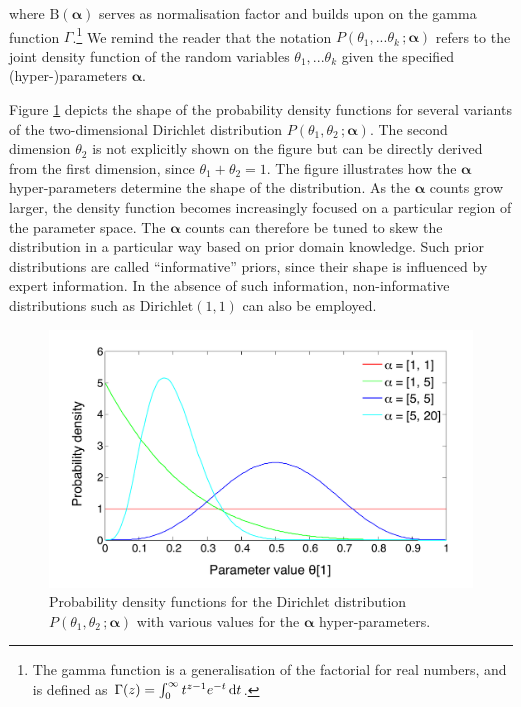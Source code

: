 where $ \mathrm{B}(\boldsymbol\alpha)$ serves as normalisation factor and builds upon on the gamma function $\Gamma$.\footnote{The gamma function is a generalisation of the factorial for real numbers, and is defined as $\Gamma(z) = \int_0^\infty  t^{z-1} e^{-t}\,{\rm d}t$.} 
We remind the reader that the notation $P(\theta_1,...\theta_k\,; \boldsymbol\alpha)$ refers to the joint density function of the random variables $\theta_1,... \theta_k$ given the specified (hyper-)parameters $\boldsymbol\alpha$. 

Figure \ref{fig:dirichletfun} depicts the shape of the probability density functions for several variants of the two-dimensional Dirichlet distribution $P(\theta_1,\theta_2\,; \boldsymbol\alpha)$.  The second dimension $\theta_2$ is not explicitly shown on the figure but can be directly derived from the first dimension, since $\theta_1 + \theta_2=1$.  The figure illustrates how the $\boldsymbol\alpha$ hyper-parameters determine the shape of the distribution. As the $\boldsymbol\alpha$ counts grow larger, the density function becomes increasingly focused on a particular region of the parameter space.  The $\boldsymbol\alpha$ counts can therefore be tuned to skew the distribution in a particular way based on prior domain knowledge. Such prior distributions are called ``informative'' priors, since their shape is influenced by expert information. In the absence of such information, non-informative distributions such as $\mathrm{Dirichlet}(1,1)$ can also be employed. 

\begin{figure}[h]
\centering
\includegraphics[scale=0.45]{imgs/dirichletfun.pdf}
\caption{Probability density functions for the Dirichlet distribution $P(\theta_1, \theta_2\,; \boldsymbol\alpha)$  with various values for the $\boldsymbol\alpha$ hyper-parameters.}
\label{fig:dirichletfun}
\end{figure}

